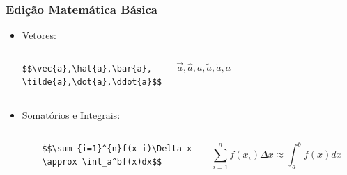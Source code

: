 \begin{frame}[fragile]
\frametitle{Edição Matemática Básica}

\begin{itemize}
  \item Vetores:
      
\begin{columns}
\small
\begin{verbatim}
$$\vec{a},\hat{a},\bar{a},
\tilde{a},\dot{a},\ddot{a}$$
\end{verbatim}
	\begin{framed}
	$$\vec{a},\hat{a},\bar{a},
	\tilde{a},\dot{a},\ddot{a}$$
	\end{framed}
\end{columns}

\item Somatórios e Integrais:
\begin{columns} \small
	\begin{verbatim}
	$$\sum_{i=1}^{n}f(x_i)\Delta x 
	\approx \int_a^bf(x)dx$$
	\end{verbatim}
	\begin{framed}
	 $$\sum_{i=1}^{n}f(x_i)\Delta x
	  \approx \int_a^bf(x)dx$$
	\end{framed}
\end{columns}

\end{itemize}
\end{frame}


